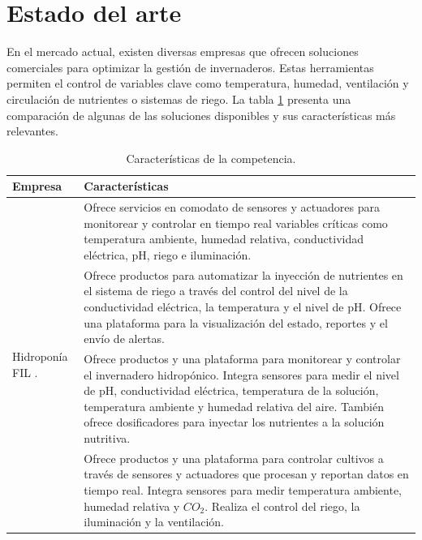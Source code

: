 
\section{Estado del arte}

En el mercado actual, existen diversas empresas que ofrecen soluciones
comerciales para optimizar la gestión de invernaderos. Estas herramientas
permiten el control de variables clave como temperatura, humedad, ventilación y
circulación de nutrientes o sistemas de riego. La tabla \ref{tab:competencia}
presenta una comparación de algunas de las soluciones disponibles y sus
características más relevantes.

\begin{table}[H]
      \centering
      \caption[Características de la competencia.]{Características de la competencia.}
      \begin{tabular}{p{3.2cm}p{9.6cm}}
            \toprule
            \textbf{Empresa}                                     & \textbf{Características}                                                         \\
            \midrule
            \multirow{4}{*}{Hidroponía FIL \cite{HidroponiaFIL}.} & Ofrece servicios en comodato de sensores y actuadores
            para monitorear y controlar en tiempo real variables críticas como temperatura ambiente, humedad relativa, conductividad
            eléctrica, pH, riego e iluminación.                                                                                                     \\
            \multirow{5}{*}{Hidrosense \cite{Hidrosense}.}        & Ofrece productos para automatizar la inyección de nutrientes en el sistema
            de riego a través del control del nivel de la conductividad eléctrica, la temperatura y el nivel de pH. Ofrece una plataforma para la
            visualización del estado, reportes y el envío de alertas.                                                                               \\
            \multirow{6}{*}{iPONIA \cite{iPonia}.}                & Ofrece productos y una plataforma para monitorear y controlar el invernadero
            hidropónico. Integra sensores para medir el nivel de pH, conductividad eléctrica, temperatura de la solución, temperatura ambiente
            y humedad relativa del aire. También ofrece dosificadores para inyectar los nutrientes a la solución nutritiva.                      \\
            \multirow{5}{*}{Growcast \cite{Growcast}.}            & Ofrece productos y una plataforma para controlar cultivos a través de sensores y
            actuadores que procesan y reportan datos en tiempo real. Integra sensores para medir temperatura ambiente, humedad relativa y
            $CO_2$. Realiza el control del riego, la iluminación y la ventilación.                                                                  \\
            \bottomrule
            \hline
      \end{tabular}
      \label{tab:competencia}
\end{table}

